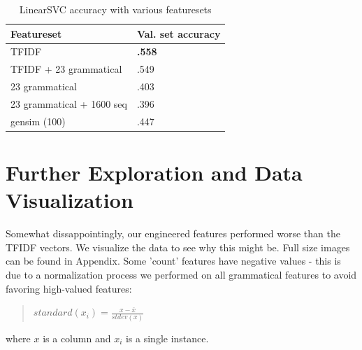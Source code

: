 \documentclass[12pt]{article}
\begin{document}
\begin{table}[]
  \centering
  \begin{tabular}{|l|l|}
    \hline
    Featureset  & Val. set accuracy \\
    \hline
    TFIDF      & \textbf{.558} \\
    TFIDF + 23 grammatical      & .549 \\ 
    23 grammatical      & .403 \\    
    23 grammatical + 1600 seq     & .396 \\  
    gensim (100)      & .447 \\  
    \hline
  \end{tabular}
  \caption{LinearSVC accuracy with various featuresets}
  \label{tab:sparseresults}
\end{table}

\section{Further Exploration and Data Visualization}
Somewhat dissappointingly, our engineered features performed worse than the TFIDF vectors. We visualize the data to see why this might be. Full size images can be found in Appendix. Some 'count' features have negative values - this is due to a normalization process we performed on all grammatical features to avoid favoring high-valued features:

\begin{quote}
$ standard(x_i) = \frac{x - \bar{x}}{stdev(x)} $
\end{quote}

where $x$ is a column and $x_i$ is a single instance.
\end{document}
